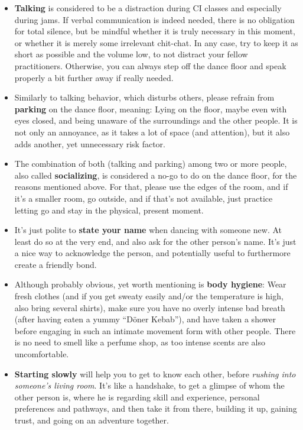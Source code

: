 \begin{itemize}
    \item \textbf{Talking} is considered to be a distraction during CI classes and especially during jams.
    If verbal communication is indeed needed, there is no obligation for total silence, but be mindful whether it is truly necessary in this moment, or whether it is merely some irrelevant chit-chat.
    In any case, try to keep it as short as possible and the volume low, to not distract your fellow practitioners.
    Otherwise, you can always step off the dance floor and speak properly a bit further away if really needed.
    \item Similarly to talking behavior, which disturbs others, please refrain from \textbf{parking} on the dance floor, meaning: Lying on the floor, maybe even with eyes closed, and being unaware of the surroundings and the other people.
    It is not only an annoyance, as it takes a lot of space (and attention), but it also adds another, yet unnecessary risk factor.
    \item The combination of both (talking and parking) among two or more people, also called \textbf{socializing}, is considered a no-go to do on the dance floor, for the reasons mentioned above.
    For that, please use the edges of the room, and if it's a smaller room, go outside, and if that's not available, just practice letting go and stay in the physical, present moment.
    \item It's just polite to \textbf{state your name} when dancing with someone new.
    At least do so at the very end, and also ask for the other person's name.
    It's just a nice way to acknowledge the person, and potentially useful to furthermore create a friendly bond.
    \item Although probably obvious, yet worth mentioning is \textbf{body hygiene}: Wear fresh clothes (and if you get sweaty easily and/or the temperature is high, also bring several shirts), make sure you have no overly intense bad breath (after having eaten a yummy ``Döner Kebab''), and have taken a shower before engaging in such an intimate movement form with other people.
    There is no need to smell like a perfume shop, as too intense scents are also uncomfortable.
    \item \textbf{Starting slowly} will help you to get to know each other, before \textit{rushing into someone's living room}.
    It's like a handshake, to get a glimpse of whom the other person is, where he is regarding skill and experience, personal preferences and pathways, and then take it from there, building it up, gaining trust, and going on an adventure together.

\end{itemize}
